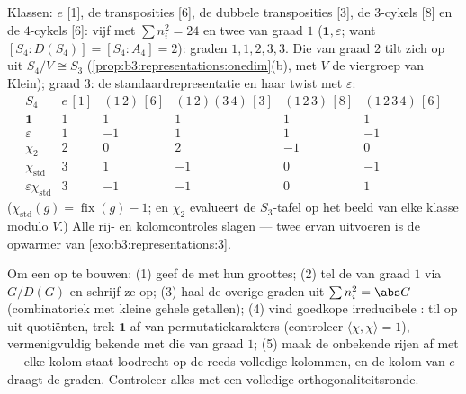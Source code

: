 \begin{example}\label{ex:b3:representations:s4}
Klassen: $e$ [1], de transposities [6], de dubbele transposities
[3], de $3$-cykels [8] en de $4$-cykels [6]: vijf  met $\sum n_i^2 = 24$ en twee van graad $1$
($\mathbf 1, \varepsilon$; want $[S_4 : D(S_4)] = [S_4 : A_4] =
2$): graden $1, 1, 2, 3, 3$. Die van graad $2$ tilt zich op uit
$S_4/V \cong S_3$ (\cref{prop:b3:representations:onedim}(b), met
$V$ de viergroep van Klein); graad $3$: de standaardrepresentatie
en haar twist met $\varepsilon$:
\[
\begin{array}{c|ccccc}
S_4 & e\,[1] & (1\,2)\,[6] & (1\,2)(3\,4)\,[3] &
(1\,2\,3)\,[8] & (1\,2\,3\,4)\,[6]\\
\hline
\mathbf 1 & 1 & 1 & 1 & 1 & 1\\
\varepsilon & 1 & -1 & 1 & 1 & -1\\
\chi_2 & 2 & 0 & 2 & -1 & 0\\
\chi_{\mathrm{std}} & 3 & 1 & -1 & 0 & -1\\
\varepsilon\chi_{\mathrm{std}} & 3 & -1 & -1 & 0 & 1
\end{array}
\]
($\chi_{\mathrm{std}}(g) = \operatorname{fix}(g) - 1$; en
$\chi_2$ evalueert de $S_3$-tafel op het beeld van elke klasse
modulo $V$.) Alle rij- en kolomcontroles slagen --- twee ervan
uitvoeren is de opwarmer van \cref{exo:b3:representations:3}.
\end{example}

\begin{method}\label{met:b3:representations:table}
Om een  op te bouwen: (1) geef de 
met hun groottes; (2) tel de  van graad $1$ via $G/D(G)$
en schrijf ze op; (3) haal de overige graden uit $\sum n_i^2 =
\abs G$ (combinatoriek met kleine gehele getallen); (4) vind
goedkope irreducibele : til op uit quotiënten, trek
$\mathbf 1$ af van permutatiekarakters (controleer
$\langle\chi,\chi\rangle = 1$), vermenigvuldig bekende 
met die van graad $1$; (5) maak de onbekende rijen af met
 --- elke kolom staat loodrecht op de reeds
volledige kolommen, en de kolom van $e$ draagt de graden.
Controleer alles met een volledige orthogonaliteitsronde.
\end{method}

